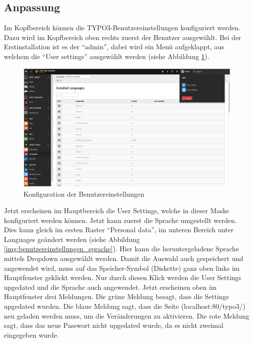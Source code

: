 \subsection{Anpassung}

Im Kopfbereich können die TYPO3-Benutzereinstellungen konfiguriert werden. Dazu wird im Kopfbereich oben rechts zuerst der Benutzer ausgewählt. Bei der Erstinstallation ist es der “admin”, dabei wird ein Menü aufgeklappt, aus welchem die “User settings” ausgewählt werden (siehe Abbildung \ref{img:benutzereinstellungen}).

\begin{figure}[ht!]
\centering
\includegraphics[width=12cm]{Figures/paula/typo3/benutzereinstellungen.png}
\caption{Konfiguration der Benutzereinstellungen}
\label{img:benutzereinstellungen}
\end{figure}

Jetzt erscheinen im Hauptbereich die User Settings, welche in dieser Maske konfiguriert werden können. Jetzt kann zuerst die Sprache umgestellt werden. Dies kann gleich im ersten Raster “Personal data”, im unteren Bereich unter Languages geändert werden (siehe Abbildung \ref{img:benutzereinstellungen_sprache}). Hier kann die heruntergeladene Sprache mittels Dropdown ausgewählt werden. Damit die Auswahl auch gespeichert und angewendet wird, muss auf das Speicher-Symbol (Diskette) ganz oben links im Hauptfenster geklickt werden. Nur durch diesen Klick werden die User Settings upgedated und die Sprache auch angewendet. Jetzt erscheinen oben im Hauptfenster drei Meldungen. Die grüne Meldung besagt, dass die Settings upgedated wurden. Die blaue Meldung sagt, dass die Seite (localhost:80/typo3/) neu geladen werden muss, um die Veränderungen zu aktivieren. Die rote Meldung sagt, dass das neue Passwort nicht upgedated wurde, da es nicht zweimal eingegeben wurde.

